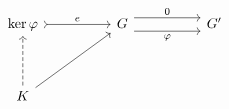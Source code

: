 \[\begin{tikzcd}
	{\ker{\varphi}} && G && {G'} \\
	\\
	K
	\arrow["0", shift left=2, from=1-3, to=1-5]
	\arrow["\varphi"', shift right=2, from=1-3, to=1-5]
	\arrow["e", tail, from=1-1, to=1-3]
	\arrow[from=3-1, to=1-3]
	\arrow[dashed, from=3-1, to=1-1]
\end{tikzcd}\]